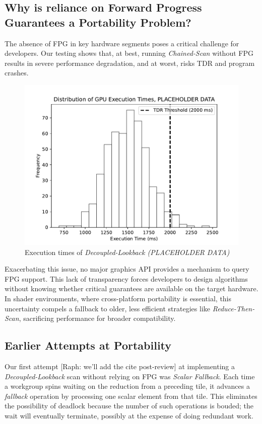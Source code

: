 \documentclass[sigconf]{acmart}
\newcommand{\raph}[1]{{\footnotesize\color{magenta}[Raph: #1]}}
\begin{document}
\subsection{Why is reliance on Forward Progress Guarantees a Portability Problem?}
The absence of FPG in key hardware segments poses a critical challenge for developers. Our testing shows that, at best, running \emph{Chained-Scan} without FPG results in severe performance degradation, and at worst, risks TDR and program crashes.
\begin{figure}
  \centering
  \includegraphics[width=\linewidth]{graphics/Figure_1.pdf}
  \caption{Execution times of \emph{Decoupled-Lookback (PLACEHOLDER DATA)}}
\end{figure}
Exacerbating this issue, no major graphics API provides a mechanism to query FPG support. This lack of transparency forces developers to design algorithms without knowing whether critical guarantees are available on the target hardware. In shader environments, where cross-platform portability is essential, this uncertainty compels a fallback to older, less efficient strategies like \emph{Reduce-Then-Scan}, sacrificing performance for broader compatibility.

\subsection{Earlier Attempts at Portability}
Our first attempt \raph{we'll add the cite post-review} at implementing a \emph{Decoupled-Lookback} scan without relying on FPG was \emph{Scalar Fallback}. Each time a workgroup spins waiting on the reduction from a preceding tile, it advances a \emph{fallback} operation by processing one scalar element from that tile. This eliminates the possibility of deadlock because the number of such operations is bouded; the wait will eventually terminate, possibly at the expense of doing redundant work.
\end{document}
